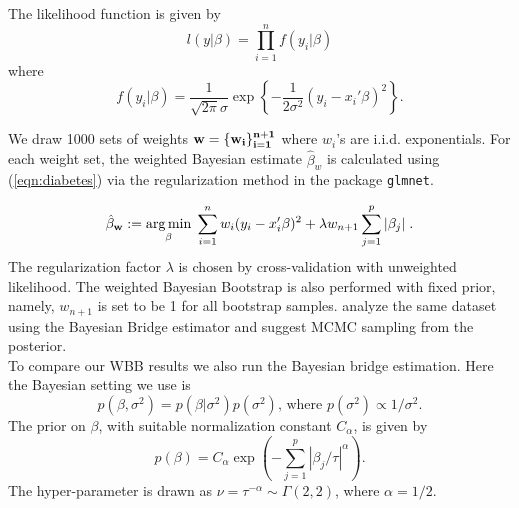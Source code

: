 \documentclass[11pt]{article}%
\DeclareMathOperator*{\argmin}{arg\,min} %
\begin{document}
\noindent The likelihood function is given by
$$
l(y|\beta) = \prod_{i=1}^n f(y_i|\beta)
$$
where
$$
f(y_i|\beta) = \frac{1}{\sqrt{2\pi}\sigma} \exp\left\{-\frac{1}{2\sigma^2}(y_i - x_i'\beta)^2 \right\}.
$$

\noindent We draw 1000 sets of weights $\bf{w} = \{w_i\}_{i=1}^{n+1}$ where $w_i$'s are i.i.d. exponentials. For each weight set, the weighted Bayesian estimate $\hat\beta_w$ is calculated using (\ref{eqn:diabetes}) via the regularization method in the package {\tt glmnet}. 

\begin{equation}
\label{eqn:diabetes}
\hat\beta_{\bf{w}} := \underset{\beta}{\argmin} \;\sum_{i=1}^n w_i(y_i - x_i'\beta)^2+ \lambda w_{n+1}\sum_{j=1}^p |\beta_j|\; . 
\end{equation}
The regularization factor $\lambda$ is chosen by cross-validation with unweighted likelihood. The weighted Bayesian Bootstrap is also performed with fixed prior, namely, $w_{n+1}$ is set to be 1 for all bootstrap samples. \cite{polson2014bayesian} analyze the same dataset using the Bayesian Bridge estimator and suggest MCMC sampling from the posterior. \\

\noindent To compare our WBB results we also run the Bayesian bridge estimation. Here the Bayesian setting we use is 
$$p(\beta, \sigma^2) = p(\beta | \sigma^2)p(\sigma^2),\, \text{where }  p(\sigma^2) \propto 1/\sigma^2.$$
The prior on $\beta$, with suitable normalization constant $C_\alpha$, is given by $$p(\beta) = C_\alpha\exp(-\sum_{j=1}^p |\beta_j/\tau|^\alpha  ).$$ The hyper-parameter is drawn as $\nu = \tau^{-\alpha} \sim \Gamma(2,2)$, where $\alpha = 1/2.$\\
\end{document}
